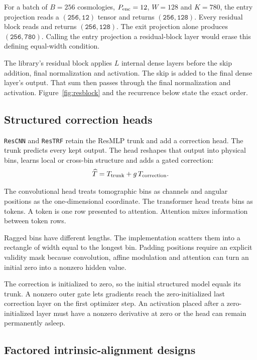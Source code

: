 \documentclass[10pt,aps,prd,twocolumn,nofootinbib]{revtex4-2}
\newcommand{\code}[1]{\texttt{#1}}
\newcommand{\shape}[1]{\ensuremath{\mathtt{#1}}}
\begin{document}
For a batch of $B=256$ cosmologies, $P_{\rm enc}=12$, $W=128$ and $K=780$,
the entry projection reads a \shape{(256,12)} tensor and returns
\shape{(256,128)}.  Every residual block reads and returns
\shape{(256,128)}.  The exit projection alone produces
\shape{(256,780)}.  Calling the entry projection a residual-block layer would
erase this defining equal-width condition.

The library's residual block applies $L$ internal dense layers before the skip
addition, final normalization and activation.  The skip is
added to the final dense layer's output.  That sum then passes through the
final normalization and activation.  Figure~\ref{fig:resblock} and the
recurrence below state the exact order.

\subsection{Structured correction heads}

\code{ResCNN} and \code{ResTRF} retain the ResMLP trunk and add a correction
head.  The trunk predicts every kept output.  The head reshapes that output
into physical bins, learns local or cross-bin structure and adds a gated
correction:
\begin{equation}
  \widehat T = T_{\rm trunk} + g\,T_{\rm correction}.
\end{equation}

The convolutional head treats tomographic bins as channels and angular
positions as the one-dimensional coordinate.  The transformer head treats
bins as tokens.  A token is one row presented to attention.  Attention mixes
information between token rows.

Ragged bins have different lengths.  The implementation scatters them into a
rectangle of width equal to the longest bin.  Padding positions require an
explicit validity mask because convolution, affine modulation and attention
can turn an initial zero into a nonzero hidden value.

The correction is initialized to zero, so the initial structured model equals
its trunk.  A nonzero outer gate lets gradients reach the zero-initialized
last correction layer on the first optimizer step.  An activation placed
after a zero-initialized layer must have a nonzero derivative at zero or the
head can remain permanently asleep.

\subsection{Factored intrinsic-alignment designs}
\end{document}
